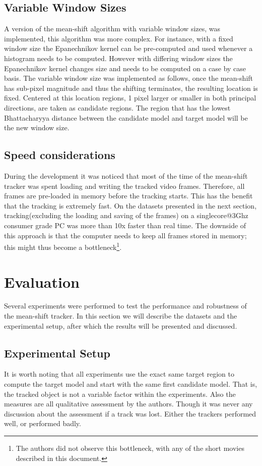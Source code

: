 \documentclass[a4paper,11pt]{article}
\begin{document}
\subsection{Variable Window Sizes}
A version of the mean-shift algorithm with variable window sizes, was implemented, this algorithm was more complex. For instance, with a fixed window size the Epanechnikov kernel can be pre-computed and used whenever a histogram needs to be computed. However with differing window sizes the Epanechnikov kernel changes size and needs to be computed on a case by case basis. 
The variable window size was implemented as follows, once the mean-shift has sub-pixel magnitude and thus the shifting terminates, the resulting location is fixed. Centered at this location regions, 1 pixel larger or smaller in both principal directions, are taken as candidate regions. The region that has the lowest Bhattacharyya distance between the candidate model and target model will be the new window size.     
  
\subsection{Speed considerations}
During the development it was noticed that most of the time of the mean-shift tracker was spent loading and writing the tracked video frames. Therefore, all frames are pre-loaded in memory before the tracking starts. This has the benefit that the tracking is extremely fast. On the datasets presented in the next section, tracking(excluding the loading and saving of the frames) on a singlecore@3Ghz consumer grade PC was more than 10x faster than real time. The downside of this approach is that the computer needs to keep all frames stored in memory; this might thus become a bottleneck\footnote{The authors did not observe this bottleneck, with any of the short movies described in this document.}.

\section{Evaluation} 
Several experiments were performed to test the performance and robustness of the mean-shift tracker. In this section we will describe the datasets and the experimental setup, after which the results will be presented and discussed.
 
\subsection{Experimental Setup}
It is worth noting that all experiments use the exact same target region to compute the target model and start with the same first candidate model.  That is, the tracked object is not a variable factor within the experiments. Also the measures are all qualitative assessment by the authors. Though it was never any discussion about the assessment if a track was lost. Either the trackers performed well, or performed badly.
\end{document}
